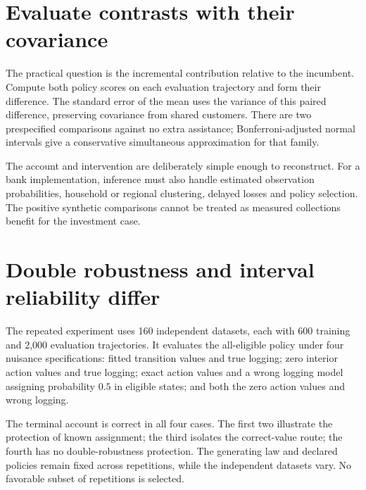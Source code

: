 \section{Evaluate contrasts with their covariance}
The practical question is the incremental contribution relative to the
incumbent. Compute both policy scores on each evaluation trajectory and
form their difference. The standard error of the mean uses the variance
of this paired difference, preserving covariance from shared customers.
There are two prespecified comparisons against no extra assistance;
Bonferroni-adjusted normal intervals give a conservative simultaneous
approximation for that family.

\begin{table}[htbp]\centering\small

\caption{Prespecified contrasts using paired DR scores. These intervals
condition on the training fits and on the synthetic complete-trajectory law.}
\label{tab:collections-contrasts}
\end{table}

The account and intervention are deliberately simple enough to reconstruct.
For a bank implementation, inference must also handle estimated observation
probabilities, household or regional clustering, delayed losses and policy
selection. The positive synthetic comparisons cannot be treated as measured
collections benefit for the investment case.

\section{Double robustness and interval reliability differ}
The repeated experiment uses 160 independent datasets, each with 600
training and 2,000 evaluation trajectories. It evaluates the all-eligible
policy under four nuisance specifications: fitted transition values and
true logging; zero interior action values and true logging; exact action
values and a wrong logging model assigning probability $0.5$ in eligible
states; and both the zero action values and wrong logging.

The terminal account is correct in all four cases. The first two illustrate
the protection of known assignment; the third isolates the correct-value
route; the fourth has no double-robustness protection. The generating law
and declared policies remain fixed across repetitions, while the independent
datasets vary. No favorable subset of repetitions is selected.

\begin{table}[htbp]\centering\small

\caption{Repeated-sample error and nominal normal-interval coverage for
all-eligible policy value. Monte Carlo standard errors for coverage range
from about 0.019 to 0.028 and are retained in the result file.}
\label{tab:collections-robustness}
\end{table}

